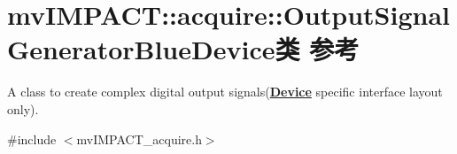\hypertarget{classmv_i_m_p_a_c_t_1_1acquire_1_1_output_signal_generator_blue_device}{\section{mv\+I\+M\+P\+A\+C\+T\+:\+:acquire\+:\+:Output\+Signal\+Generator\+Blue\+Device类 参考}
\label{classmv_i_m_p_a_c_t_1_1acquire_1_1_output_signal_generator_blue_device}
}


A class to create complex digital output signals({\bfseries \hyperlink{classmv_i_m_p_a_c_t_1_1acquire_1_1_device}{Device}} specific interface layout only).  




{\ttfamily \#include $<$mv\+I\+M\+P\+A\+C\+T\+\_\+acquire.\+h$>$}

